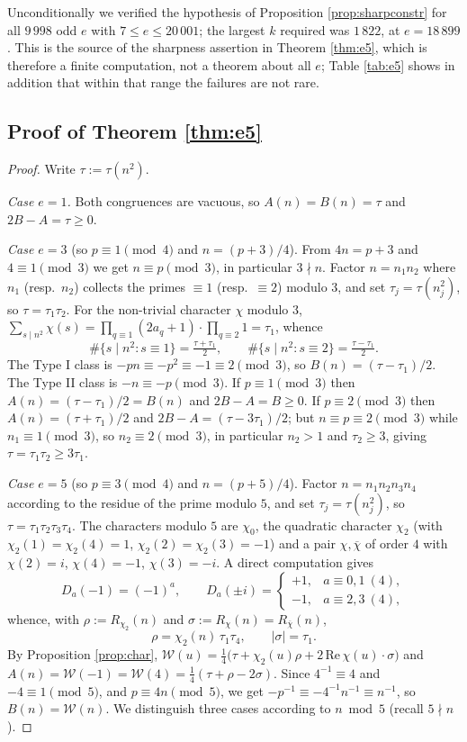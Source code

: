 \documentclass[11pt,reqno]{amsart}
\theoremstyle{plain}
\theoremstyle{definition}
\numberwithin{equation}{section}
\begin{document}
Unconditionally we verified the hypothesis of Proposition \ref{prop:sharpconstr} for all
$9\,998$ odd $e$ with $7\le e\le20\,001$; the largest $k$ required was $1\,822$, at
$e=18\,899$. This is the source of the sharpness assertion in Theorem \ref{thm:e5},
which is therefore a finite computation, not a theorem about all $e$; Table
\ref{tab:e5} shows in addition that within that range the failures are not rare.

\subsection{Proof of Theorem \ref{thm:e5}}

\begin{proof}
Write $\tau:=\tau(n^{2})$.

\emph{Case $e=1$.} Both congruences are vacuous, so $A(n)=B(n)=\tau$ and
$2B-A=\tau\ge0$.

\emph{Case $e=3$} (so $p\equiv1\pmod4$ and $n=(p+3)/4$). From $4n=p+3$ and
$4\equiv1\pmod3$ we get $n\equiv p\pmod3$, in particular $3\nmid n$. Factor
$n=n_{1}n_{2}$ where $n_{1}$ (resp.\ $n_{2}$) collects the primes $\equiv1$
(resp.\ $\equiv2$) modulo $3$, and set $\tau_{j}=\tau(n_{j}^{2})$, so
$\tau=\tau_{1}\tau_{2}$. For the non-trivial character $\chi$ modulo $3$,
$\sum_{s\mid n^{2}}\chi(s)=\prod_{q\equiv1}(2a_{q}+1)\cdot\prod_{q\equiv2}1=\tau_{1}$,
whence
\[
  \#\{s\mid n^{2}: s\equiv1\}=\tfrac{\tau+\tau_{1}}2,\qquad
  \#\{s\mid n^{2}: s\equiv2\}=\tfrac{\tau-\tau_{1}}2 .
\]
The Type I class is $-pn\equiv-p^{2}\equiv-1\equiv2\pmod3$, so
$B(n)=(\tau-\tau_{1})/2$. The Type II class is $-n\equiv-p\pmod3$. If
$p\equiv1\pmod3$ then $A(n)=(\tau-\tau_{1})/2=B(n)$ and $2B-A=B\ge0$. If
$p\equiv2\pmod3$ then $A(n)=(\tau+\tau_{1})/2$ and $2B-A=(\tau-3\tau_{1})/2$; but
$n\equiv p\equiv2\pmod 3$ while $n_{1}\equiv1\pmod3$, so $n_{2}\equiv2\pmod3$, in
particular $n_{2}>1$ and $\tau_{2}\ge3$, giving $\tau=\tau_{1}\tau_{2}\ge3\tau_{1}$.

\emph{Case $e=5$} (so $p\equiv3\pmod4$ and $n=(p+5)/4$). Factor
$n=n_{1}n_{2}n_{3}n_{4}$ according to the residue of the prime modulo $5$, and set
$\tau_{j}=\tau(n_{j}^{2})$, so $\tau=\tau_{1}\tau_{2}\tau_{3}\tau_{4}$. The characters
modulo $5$ are $\chi_{0}$, the quadratic character $\chi_{2}$ (with
$\chi_{2}(1)=\chi_{2}(4)=1$, $\chi_{2}(2)=\chi_{2}(3)=-1$) and a pair
$\chi,\overline\chi$ of order $4$ with $\chi(2)=i$, $\chi(4)=-1$, $\chi(3)=-i$. A
direct computation gives
\[
  D_{a}(-1)=(-1)^{a},\qquad
  D_{a}(\pm i)=\begin{cases}+1,& a\equiv0,1\ (4),\\ -1,& a\equiv2,3\ (4),\end{cases}
\]
whence, with $\rho:=R_{\chi_{2}}(n)$ and $\sigma:=R_{\chi}(n)=R_{\overline\chi}(n)$,
\[
  \rho=\chi_{2}(n)\,\tau_{1}\tau_{4},\qquad |\sigma|=\tau_{1} .
\]
By Proposition \ref{prop:char},
$\mathcal W(u)=\tfrac14\bigl(\tau+\chi_{2}(u)\rho+2\,\mathrm{Re}\,\chi(u)\cdot\sigma\bigr)$
and $A(n)=\mathcal W(-1)=\mathcal W(4)=\tfrac14(\tau+\rho-2\sigma)$. Since
$4^{-1}\equiv4$ and $-4\equiv1\pmod5$, and $p\equiv4n\pmod 5$, we get
$-p^{-1}\equiv-4^{-1}n^{-1}\equiv n^{-1}$, so $B(n)=\mathcal W(n)$. We distinguish
three cases according to $n\bmod5$ (recall $5\nmid n$).


\end{proof}
\end{document}
